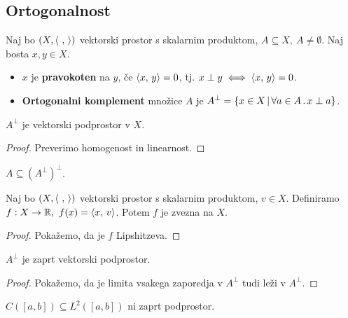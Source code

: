 \begin{zgled}
    \todo{}
\end{zgled}

\subsection{Ortogonalnost}
\begin{definicija}
    Naj bo \((X, \left\langle \ , \,  \right\rangle)\) vektorski prostor s skalarnim produktom, \(A \subseteq X, \ A \neq \emptyset\). Naj bosta \(x, y \in X\).
    \begin{itemize}
        \item \(x\) je \textbf{pravokoten} na \(y\), če \(\left\langle x, \, y \right\rangle = 0\), tj. \(x \perp y \iff \left\langle x, \, y \right\rangle = 0\).
        \item \textbf{Ortogonalni komplement} množice \(A\) je \(A^\perp = \left\{x \in X \,|\, \forall a \in A \,.\, x \perp a\right\}\).
    \end{itemize}
\end{definicija}

\begin{trditev}
    \(A^\perp\) je vektorski podprostor v \(X\).
\end{trditev}

\begin{proof}
    Preverimo homogenost in linearnost.
\end{proof}

\begin{opomba}
    \(A \subseteq (A^\perp)^\perp\).
\end{opomba}

\begin{trditev}
    Naj bo \((X, \left\langle \ , \,  \right\rangle)\) vektorski prostor s skalarnim produktom, \(v \in X\). Definiramo \(f: X \to \mathbb{R}, \ f(x) = \left\langle x, \, v \right\rangle\). Potem \(f\) je zvezna na \(X\).
\end{trditev}

\begin{proof}
    Pokažemo, da je \(f\) Lipshitzeva.
\end{proof}

\begin{posledica}
    \(A^\perp\) je zaprt vektorski podprostor.
\end{posledica}

\begin{proof}
    Pokažemo, da je limita vsakega zaporedja v \(A^\perp\) tudi leži v \(A^\perp\).
\end{proof}

\begin{opomba}
    \(C([a, b]) \subseteq L^2([a,b])\) ni zaprt podprostor.
\end{opomba}

